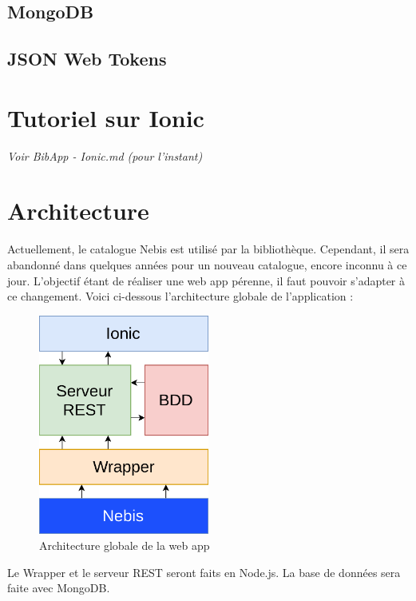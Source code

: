 \documentclass[a4paper, 12pt]{article}
\begin{document}
\subsection{MongoDB}
\subsection{JSON Web Tokens}

\section{Tutoriel sur Ionic}
\textit{Voir BibApp - Ionic.md (pour l'instant)}



\section{Architecture}
Actuellement, le catalogue Nebis est utilisé par la bibliothèque. Cependant, il sera abandonné dans quelques 
années pour un nouveau catalogue, encore inconnu à ce jour. L'objectif étant de réaliser une web app pérenne, 
il faut pouvoir s'adapter à ce changement. Voici ci-dessous l'architecture globale de l'application :
\begin{figure}
	\begin{center}
		\includegraphics[width=0.5\textwidth]{images/architecture.png}
	\end{center}
	\caption{Architecture globale de la web app}
\end{figure}
Le Wrapper et le serveur REST seront faits en Node.js. La base de données sera faite avec MongoDB.
\end{document}
